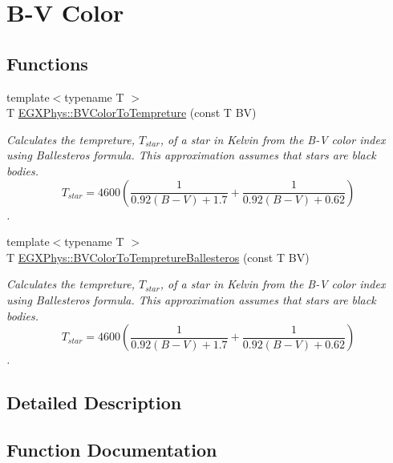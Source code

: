 \hypertarget{group___e_g_x_phys-_astrophysic-_b-_v_color}{}\section{B-\/V Color}
\label{group___e_g_x_phys-_astrophysic-_b-_v_color}
\subsection*{Functions}
\begin{DoxyCompactItemize}
\item 
{\footnotesize template$<$typename T $>$ }\\T \mbox{\hyperlink{group___e_g_x_phys-_astrophysic-_b-_v_color_gad251a8c25285f5817e307c35c3ec971a}{E\+G\+X\+Phys\+::\+B\+V\+Color\+To\+Tempreture}} (const T BV)
\begin{DoxyCompactList}\small\item\em Calculates the tempreture, $T_{star}$, of a star in Kelvin from the B-\/V color index using Ballesteros\textquotesingle{} formula. This approximation assumes that stars are black bodies. \[T_{star}=4600 \left ( \frac{1}{0.92 (B-V)+ 1.7} + \frac{1}{0.92 (B-V) + 0.62} \right )\]. \end{DoxyCompactList}\item 
{\footnotesize template$<$typename T $>$ }\\T \mbox{\hyperlink{group___e_g_x_phys-_astrophysic-_b-_v_color_ga0e553143a3bb121c3ae50ca96c502140}{E\+G\+X\+Phys\+::\+B\+V\+Color\+To\+Tempreture\+Ballesteros}} (const T BV)
\begin{DoxyCompactList}\small\item\em Calculates the tempreture, $T_{star}$, of a star in Kelvin from the B-\/V color index using Ballesteros\textquotesingle{} formula. This approximation assumes that stars are black bodies. \[T_{star}=4600 \left ( \frac{1}{0.92 (B-V)+ 1.7} + \frac{1}{0.92 (B-V) + 0.62} \right )\]. \end{DoxyCompactList}\end{DoxyCompactItemize}


\subsection{Detailed Description}


\subsection{Function Documentation}
\mbox{\label{group___e_g_x_phys-_astrophysic-_b-_v_color_gad251a8c25285f5817e307c35c3ec971a}} 
